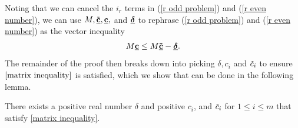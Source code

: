 \documentclass[12pt]{article}
\begin{document}
Noting that we can cancel the $i_r$ terms in (\ref{r odd problem}) and (\ref{r even number}), we can use $M, \underline{\Tilde{\mathbf{c}}}, \underline{\mathbf{c}},$ and $\underline{\text{\boldmath$\delta$}}$ to rephrase (\ref{r odd problem}) and (\ref{r even number}) as the vector inequality
\begin{align}\label{matrix inequality}
    M \underline{\mathbf{c}} \leq M  \underline{\mathbf{\Tilde{c}}}- \underline{\text{\boldmath$\delta$}}.
\end{align}
The remainder of the proof then breaks down into picking $\delta, c_i$ and $\Tilde{c}_i$ to ensure $\eqref{matrix inequality}$ is satisfied, which we show that can be done in the following lemma.

    \begin{lemma} \label{matrix lemma}
            There exists a positive real number $\delta$ and positive $c_i$, and $\Tilde{c}_i$ for $1 \leq i \leq m$ that satisfy \eqref{matrix inequality}.
        \end{lemma}
\end{document}
